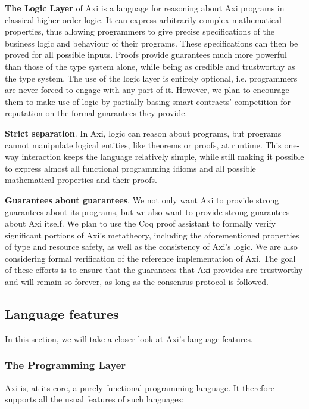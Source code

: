 \textbf{The Logic Layer} of Axi is a language for reasoning about Axi programs in classical higher-order logic. It can express arbitrarily complex mathematical properties, thus allowing programmers to give precise specifications of the business logic and behaviour of their programs. These specifications can then be proved for all possible inputs. Proofs provide guarantees much more powerful than those of the type system alone, while being as credible and trustworthy as the type system. The use of the logic layer is entirely optional, i.e. programmers are never forced to engage with any part of it. However, we plan to encourage them to make use of logic by partially basing smart contracts' competition for reputation on the formal guarantees they provide.

\textbf{Strict separation}. In Axi, logic can reason about programs, but programs cannot manipulate logical entities, like theorems or proofs, at runtime. This one-way interaction keeps the language relatively simple, while still making it possible to express almost all functional programming idioms and all possible mathematical properties and their proofs.

\textbf{Guarantees about guarantees}. We not only want Axi to provide strong guarantees about its programs, but we also want to provide strong guarantees about Axi itself. We plan to use the Coq proof assistant to formally verify significant portions of Axi's metatheory, including the aforementioned properties of type and resource safety, as well as the consistency of Axi's logic. We are also considering formal verification of the reference implementation of Axi. The goal of these efforts is to ensure that the guarantees that Axi provides are trustworthy and will remain so forever, as long as the consensus protocol is followed.

\subsection{Language features}

In this section, we will take a closer look at Axi's language features.

\subsubsection{The Programming Layer}

Axi is, at its core, a purely functional programming language. It therefore supports all the usual features of such languages:

